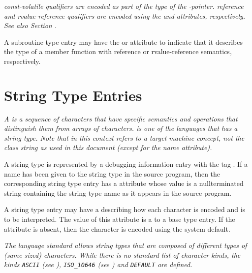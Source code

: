 \textit{ const-volatile qualifiers are encoded as 
part of the type of the
-pointer. 
 reference and rvalue-reference qualifiers are encoded using
the \DWATreference{} and \DWATrvaluereference{} attributes, respectively. 
See also Section .}

A subroutine type entry may have the \DWATreference{} or
\DWATrvaluereference{} attribute to indicate that it describes the
type of a member function with reference or rvalue-reference 
semantics, respectively.

\section{String Type Entries}
\label{chap:stringtypeentries}

\textit{A  is a sequence of characters that have specific
semantics and operations that distinguish them from arrays of
characters. 
 is one of the languages that has a string
type. Note that  in this context refers to a target
machine concept, not the class string as used in this document
(except for the name attribute).}

A string type is represented by a debugging information entry
with the tag \DWTAGstringtypeTARG. 
If a name has been given to
the string type in the source program, then the corresponding
string type entry has a 
\DWATname{} attribute
whose value is
a null\dash terminated string containing the string type name as
it appears in the source program.

A string type entry may have a \DWATtypeDEFN{} 
describing how each character is encoded and is to be interpreted.  
The value of this attribute is a \CLASSreference{} to a 
\DWTAGbasetype{} base type entry.  If the attribute is absent, 
then the character is encoded using the system default.

\textit{The 
 language standard allows string 
types that are composed of different types of (same sized) characters. 
While there is no standard list of character kinds, the kinds
\texttt{ASCII} (see \DWATEASCII), 
\texttt{ISO\_10646}
(see \DWATEUCS) and 
\texttt{DEFAULT}
are defined.}

